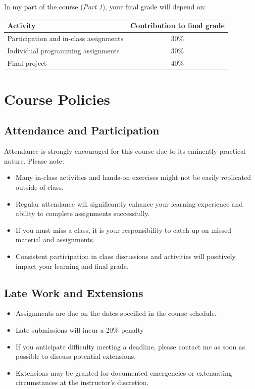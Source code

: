 \documentclass[
  letterpaper,
  DIV=11,
  numbers=noendperiod]{scrreprt}
\providecommand{\tightlist}{%
  \setlength{\itemsep}{0pt}\setlength{\parskip}{0pt}}\usepackage{longtable,booktabs,array}
\begin{document}
In my part of the course (\emph{Part 1}), your final grade will depend
on:

\begin{longtable}[]{@{}lc@{}}
\toprule()
Activity & Contribution to final grade \\
\midrule()
\endhead
Participation and in-class assignments & 30\% \\
Individual programming assignments & 30\% \\
Final project & 40\% \\
\bottomrule()
\end{longtable}

\hypertarget{course-policies}{%
\section{Course Policies}\label{course-policies}}

\hypertarget{attendance-and-participation}{%
\subsection{Attendance and
Participation}\label{attendance-and-participation}}

Attendance is strongly encouraged for this course due to its eminently
practical nature. Please note:

\begin{itemize}
\tightlist
\item
  Many in-class activities and hands-on exercises might not be easily
  replicated outside of class.
\item
  Regular attendance will significantly enhance your learning experience
  and ability to complete assignments successfully.
\item
  If you must miss a class, it is your responsibility to catch up on
  missed material and assignments.
\item
  Consistent participation in class discussions and activities will
  positively impact your learning and final grade.
\end{itemize}

\hypertarget{late-work-and-extensions}{%
\subsection{Late Work and Extensions}\label{late-work-and-extensions}}

\begin{itemize}
\tightlist
\item
  Assignments are due on the dates specified in the course schedule.
\item
  Late submissions will incur a 20\% penalty
\item
  If you anticipate difficulty meeting a deadline, please contact me as
  soon as possible to discuss potential extensions.
\item
  Extensions may be granted for documented emergencies or extenuating
  circumstances at the instructor's discretion.
\end{itemize}
\end{document}

